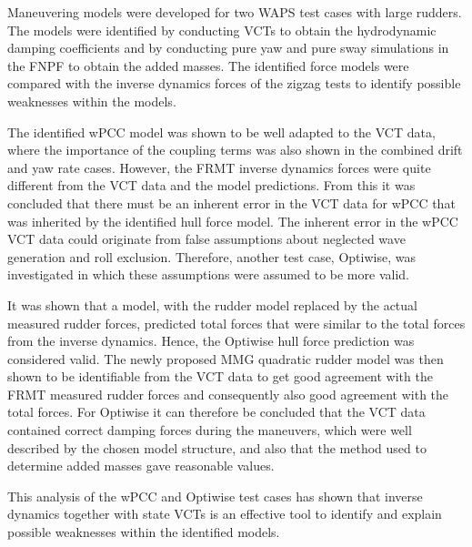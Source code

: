 %
\noindent Maneuvering models were developed for two WAPS test cases with large rudders. The models were identified by conducting VCTs to obtain the hydrodynamic damping coefficients and by conducting pure yaw and pure sway simulations in the FNPF to obtain the added masses. The identified force models were compared with the inverse dynamics forces of the zigzag tests to identify possible weaknesses within the models.  

The identified wPCC model was shown to be well adapted to the VCT data, where the importance of the coupling terms was also shown in the combined drift and yaw rate cases.
However, the FRMT inverse dynamics forces were quite different from the VCT data and the model predictions. From this it was concluded that there must be an inherent error in the VCT data for wPCC that was inherited by the identified hull force model.
The inherent error in the wPCC VCT data could originate from false assumptions about neglected wave generation and roll exclusion. Therefore, another test case, Optiwise, was investigated in which these assumptions were assumed to be more valid.

It was shown that a model, with the rudder model replaced by the actual measured rudder forces, predicted total forces that were similar to the total forces from the inverse dynamics. Hence, the Optiwise hull force prediction was considered valid.
The newly proposed MMG quadratic rudder model was then shown to be identifiable from the VCT data to get good agreement with the FRMT measured rudder forces and consequently also good agreement with the total forces. 
For Optiwise it can therefore be concluded that the VCT data contained correct damping forces during the maneuvers, which were well described by the chosen model structure, and also that the method used to determine added masses gave reasonable values. 

This analysis of the wPCC and Optiwise test cases has shown that inverse dynamics together with state VCTs is an effective tool to identify and explain possible weaknesses within the identified models.
%
%

